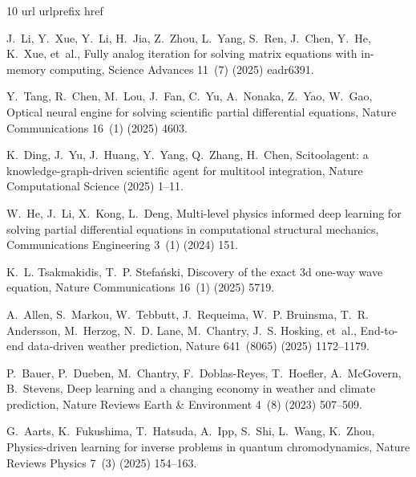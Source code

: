 \documentclass[preprint,numbers,sort&compress]{elsarticle}
\begin{document}
			\begin{thebibliography}{10}
				\expandafter\ifx\csname url\endcsname\relax
				\def\url#1{\texttt{#1}}\fi
				\expandafter\ifx\csname urlprefix\endcsname\relax\def\urlprefix{URL }\fi
				\expandafter\ifx\csname href\endcsname\relax
				\def\href#1#2{#2} \def\path#1{#1}\fi
				
				J.~Li, Y.~Xue, Y.~Li, H.~Jia, Z.~Zhou, L.~Yang, S.~Ren, J.~Chen, Y.~He, K.~Xue,
				et~al., Fully analog iteration for solving matrix equations with in-memory
				computing, Science Advances 11~(7) (2025) eadr6391.
				
				Y.~Tang, R.~Chen, M.~Lou, J.~Fan, C.~Yu, A.~Nonaka, Z.~Yao, W.~Gao, Optical
				neural engine for solving scientific partial differential equations, Nature
				Communications 16~(1) (2025) 4603.
				
				K.~Ding, J.~Yu, J.~Huang, Y.~Yang, Q.~Zhang, H.~Chen, Scitoolagent: a
				knowledge-graph-driven scientific agent for multitool integration, Nature
				Computational Science (2025) 1--11.
				
				W.~He, J.~Li, X.~Kong, L.~Deng, Multi-level physics informed deep learning for
				solving partial differential equations in computational structural mechanics,
				Communications Engineering 3~(1) (2024) 151.
				
				K.~L. Tsakmakidis, T.~P. Stefa{\'n}ski, Discovery of the exact 3d one-way wave
				equation, Nature Communications 16~(1) (2025) 5719.
				
				A.~Allen, S.~Markou, W.~Tebbutt, J.~Requeima, W.~P. Bruinsma, T.~R. Andersson,
				M.~Herzog, N.~D. Lane, M.~Chantry, J.~S. Hosking, et~al., End-to-end
				data-driven weather prediction, Nature 641~(8065) (2025) 1172--1179.
				
				P.~Bauer, P.~Dueben, M.~Chantry, F.~Doblas-Reyes, T.~Hoefler, A.~McGovern,
				B.~Stevens, Deep learning and a changing economy in weather and climate
				prediction, Nature Reviews Earth \& Environment 4~(8) (2023) 507--509.
				
				G.~Aarts, K.~Fukushima, T.~Hatsuda, A.~Ipp, S.~Shi, L.~Wang, K.~Zhou,
				Physics-driven learning for inverse problems in quantum chromodynamics,
				Nature Reviews Physics 7~(3) (2025) 154--163.
				

\end{thebibliography}
\end{document}
